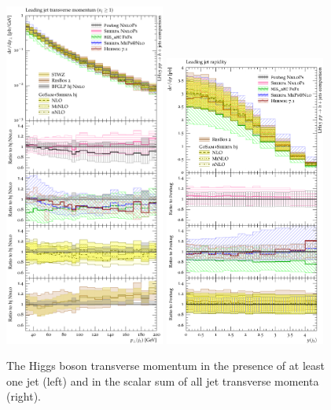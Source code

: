 \begin{figure}[t!]
  \centering
  \includegraphics[width=0.47\textwidth]{figures/hjetscomp_jet1_pT_incl.pdf}
  \quad
  \includegraphics[width=0.47\textwidth]{figures/hjetscomp_jet1_y.pdf}
  \caption{
    The Higgs boson transverse momentum in the presence of at least one 
    jet (left) and in the scalar sum of all jet transverse momenta (right).
    \label{fig:higgscomp:results:1obs:j1pt_j1y}
  }
\end{figure}

